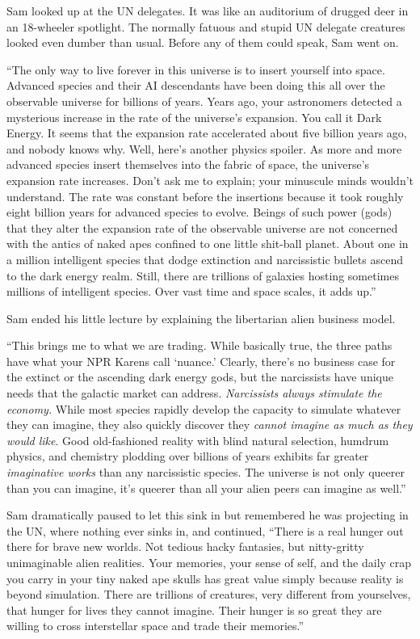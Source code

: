 Sam looked up at the UN delegates. It was like an auditorium of drugged
deer in an 18-wheeler spotlight. The normally fatuous and stupid UN
delegate creatures looked even dumber than usual. Before any of them
could speak, Sam went on.

``The only way to live forever in this universe is to insert yourself
into space. Advanced species and their AI descendants have been doing
this all over the observable universe for billions of years. Years ago,
your astronomers detected a mysterious increase in the rate of the
universe's expansion. You call it Dark Energy. It seems that the
expansion rate accelerated about five billion years ago, and nobody
knows why. Well, here's another physics spoiler. As more and more
advanced species insert themselves into the fabric of space, the
universe's expansion rate increases. Don't ask me to explain; your
minuscule minds wouldn't understand. The rate was constant before the
insertions because it took roughly eight billion years for advanced
species to evolve. Beings of such power (gods) that they alter the
expansion rate of the observable universe are not concerned with the
antics of naked apes confined to one little shit-ball planet. About one
in a million intelligent species that dodge extinction and narcissistic
bullets ascend to the dark energy realm. Still, there are trillions of
galaxies hosting sometimes millions of intelligent species. Over vast
time and space scales, it adds up.''

Sam ended his little lecture by explaining the libertarian alien
business model.

``This brings me to what we are trading. While basically true, the three
paths have what your NPR Karens call `nuance.' Clearly, there's no
business case for the extinct or the ascending dark energy gods, but the
narcissists have unique needs that the galactic market can address.
\emph{Narcissists always stimulate the economy.} While most species
rapidly develop the capacity to simulate whatever they can imagine, they
also quickly discover they \emph{cannot imagine as much as they would
like}. Good old-fashioned reality with blind natural selection, humdrum
physics, and chemistry plodding over billions of years exhibits far
greater \emph{imaginative works} than any narcissistic species. The
universe is not only queerer than you can imagine, it's queerer than all
your alien peers can imagine as well.''

Sam dramatically paused to let this sink in but remembered he was
projecting in the UN, where nothing ever sinks in, and continued,
``There is a real hunger out there for brave new worlds. Not tedious
hacky fantasies, but nitty-gritty unimaginable alien realities. Your
memories, your sense of self, and the daily crap you carry in your tiny
naked ape skulls has great value simply because reality is beyond
simulation. There are trillions of creatures, very different from
yourselves, that hunger for lives they cannot imagine. Their hunger is
so great they are willing to cross interstellar space and trade their
memories.''

